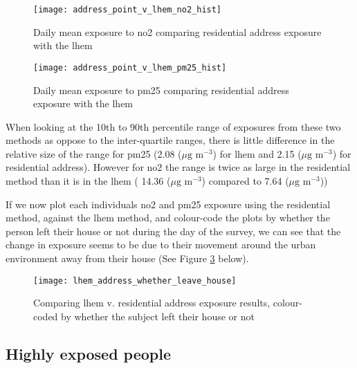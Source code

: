 \begin{figure}[H]
\centering
\texttt{[image: address\_point\_v\_lhem\_no2\_hist]}
\caption{Daily mean exposure to \gls{no2} comparing residential address exposure with the \gls{lhem}}
\label{fig:address_point_v_lhem_no2_hist}
\end{figure}

\begin{figure}[H]
\centering
\texttt{[image: address\_point\_v\_lhem\_pm25\_hist]}
\caption{Daily mean exposure to \gls{pm25} comparing residential address exposure with the \gls{lhem}}
\label{fig:address_point_v_lhem_pm25_hist}
\end{figure}

When looking at the 10th to 90th percentile range of exposures from these two methods as oppose to the 
inter-quartile ranges, there is little difference in the relative size of the range for \gls{pm25} (2.08 ($\mu \text{g m}^{-3}$) for \gls{lhem} and 2.15 ($\mu \text{g m}^{-3}$) for residential address). However for \gls{no2} the range is twice as large in the residential method than it is in the \gls{lhem} ( 14.36 ($\mu \text{g m}^{-3}$) compared to 7.64 ($\mu \text{g m}^{-3}$))

If we now plot each individuals \gls{no2} and \gls{pm25} exposure using the residential method, against the \gls{lhem} method, and colour-code the plots by whether the person left their house or not during the day of the survey, we can see that the change in exposure seems to be due to their movement around the urban environment away from their house (See Figure \ref{fig:lhem_address_whether_leave_house} below).

\begin{figure}[H]
\centering
\texttt{[image: lhem\_address\_whether\_leave\_house]}
\caption{Comparing \gls{lhem} v. residential address exposure results, colour-coded by whether the subject left their house or not}
\label{fig:lhem_address_whether_leave_house}
\end{figure}

\subsection{Highly exposed people}
\label{subsec:highly_exposed_people}

